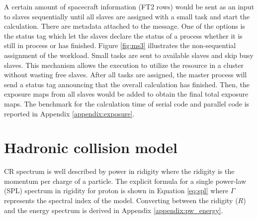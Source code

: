 A certain amount of spacecraft information (FT2 rows)
would be sent as an input to slaves sequentially
until all slaves are assigned with a small task
and start the calculation.
There are metadata attached
to the message. 
One of the options is the status tag
which let the slaves declare the status of a process
whether it is still in process or has finished.
Figure \ref{fig:ms3} illustrates 
the non-sequential assignment of the workload.
Small tasks are sent to available slaves and skip busy slaves.
This mechanism allows the execution to utilize 
the resource in a cluster without wasting
free slaves. After all tasks are assigned,
the master process will send a status tag announcing
that the overall calculation has finished.
Then, the exposure maps from all slaves would be added
to obtain the final total exposure maps.
The benchmark for the calculation time of serial code
and parallel code is reported in Appendix \ref{appendix:exposure}.




\section{Hadronic collision model}
CR spectrum is well described by power in ridigity where 
the ridigity is the momentum per charge of a particle.
The explicit formula for
a single power-law (SPL) spectrum in rigidity for proton
is shown in Equation \ref{eq:spl}
where $\Gamma$ represents the spectral index of the model. 
Converting between the ridigity ($R$) and the 
energy spectrum is derived in Appendix \ref{appendix:pw_energy}.


